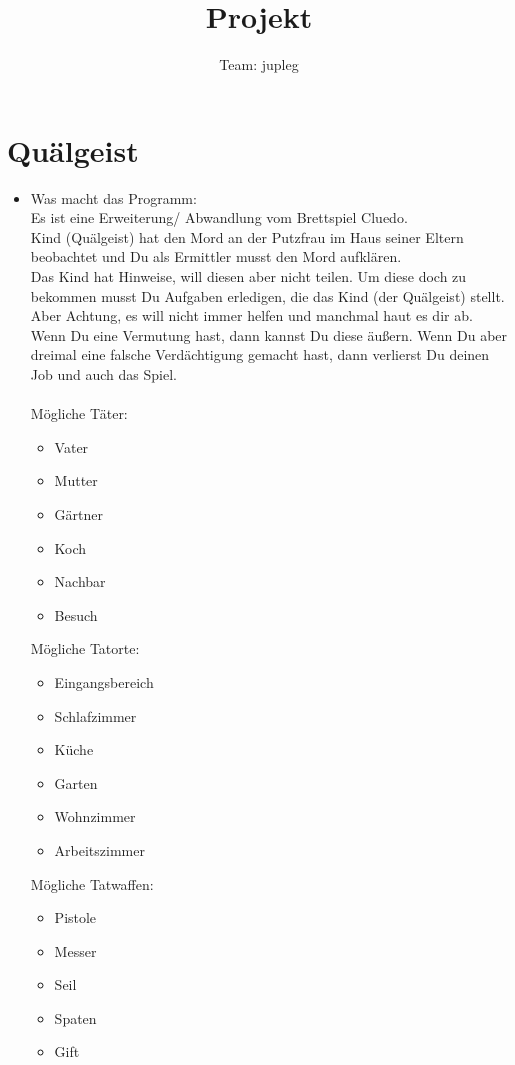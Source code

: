 \documentclass[10pt,a4paper]{article}
\title{Projekt}
\author{Team: jupleg}
\begin{document}
\maketitle
\newcommand{\thetitle} {Projekt}

\section*{Quälgeist}
\begin{itemize}
\item Was macht das Programm:\\
Es ist eine Erweiterung/ Abwandlung vom Brettspiel Cluedo.\\
Kind (Quälgeist) hat den Mord an der Putzfrau im Haus seiner Eltern beobachtet und Du als Ermittler musst den Mord aufklären.\\
Das Kind hat Hinweise, will diesen aber nicht teilen. Um diese doch zu bekommen musst Du Aufgaben erledigen, die das Kind (der Quälgeist) stellt. Aber Achtung, es will nicht immer helfen und manchmal haut es dir ab.\\
Wenn Du eine Vermutung hast, dann kannst Du diese äußern. 
Wenn Du aber dreimal eine falsche Verdächtigung gemacht hast, dann verlierst Du deinen Job und auch das Spiel.\\
\ \\
Mögliche Täter:
\begin{itemize}
\item Vater
\item Mutter
\item Gärtner
\item Koch
\item Nachbar
\item Besuch
\end{itemize}
Mögliche Tatorte:
\begin{itemize}
\item Eingangsbereich
\item Schlafzimmer
\item Küche
\item Garten
\item Wohnzimmer
\item Arbeitszimmer
\end{itemize}
Mögliche Tatwaffen:
\begin{itemize}
\item Pistole
\item Messer
\item Seil
\item Spaten
\item Gift

\end{itemize}
\end{itemize}
\end{document}
